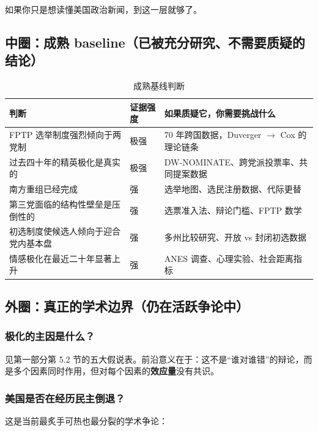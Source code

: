 \documentclass[12pt,a4paper]{ctexart}
\begin{document}
如果你只是想读懂美国政治新闻，到这一层就够了。

\subsection{中圈：成熟 baseline（已被充分研究、不需要质疑的结论）}

\begin{table}[h]
\centering
\caption{成熟基线判断}
\begin{tabular}{@{}lp{7.6cm}p{5.8cm}@{}}
\toprule
\textbf{判断} & \textbf{证据强度} & \textbf{如果质疑它，你需要挑战什么} \\
\midrule
FPTP 选举制度强烈倾向于两党制 & 极强 & 70 年跨国数据，Duverger $\rightarrow$ Cox 的理论链条 \\
过去四十年的精英极化是真实的 & 极强 & DW-NOMINATE、跨党派投票率、共同提案数据 \\
南方重组已经完成 & 强 & 选举地图、选民注册数据、代际更替 \\
第三党面临的结构性壁垒是压倒性的 & 强 & 选票准入法、辩论门槛、FPTP 数学 \\
初选制度使候选人倾向于迎合党内基本盘 & 强 & 多州比较研究、开放 vs 封闭初选数据 \\
情感极化在最近二十年显著上升 & 强 & ANES 调查、心理实验、社会距离指标 \\
\bottomrule
\end{tabular}
\end{table}

\subsection{外圈：真正的学术边界（仍在活跃争论中）}

\subsubsection{极化的主因是什么？}

见第一部分第 5.2 节的五大假说表。前沿意义在于：这不是``谁对谁错''的辩论，而是多个因素同时作用，但对每个因素的\textbf{效应量}没有共识。

\subsubsection{美国是否在经历民主倒退？}

这是当前最炙手可热也最分裂的学术争论：
\end{document}
